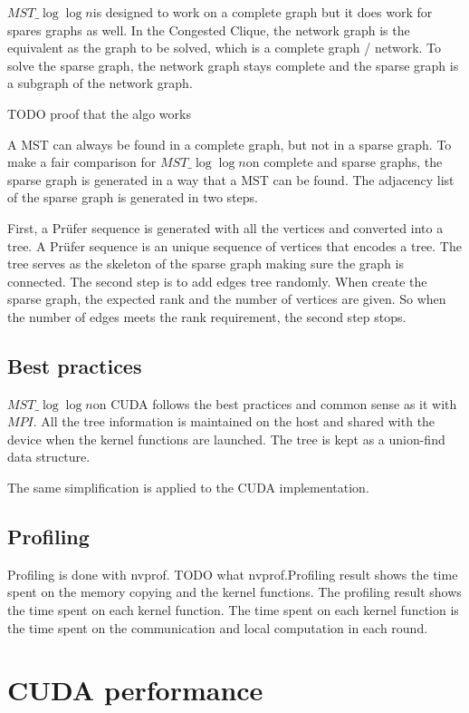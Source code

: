 \documentclass[english, 12pt, a4paper, elec, utf8, a-2b, online]{aaltothesis}
\newcommand{\mstalgo}{$MST\_\log\log{n}$}
\begin{document}
\mstalgo is designed to work on a complete graph but it does work for spares graphs as well. In the Congested Clique, the network graph is the equivalent as the graph to be solved, which is a complete graph / network. To solve the sparse graph, the network graph stays complete and the sparse graph is a subgraph of the network graph. 

TODO proof that the algo works

A MST can always be found in a complete graph, but not in a sparse graph. To make a fair comparison for \mstalgo on complete and sparse graphs, the sparse graph is generated in a way that a MST can be found. The adjacency list of the sparse graph is generated in two steps.

First, a Prüfer sequence is generated with all the vertices and converted into a tree. A Prüfer sequence is an unique sequence of vertices that encodes a tree. The tree serves as the skeleton of the sparse graph making sure the graph is connected. The second step is to add edges tree randomly. When create the sparse graph, the expected rank and the number of vertices are given. So when the number of edges meets the rank requirement, the second step stops.

\subsection{Best practices}
\mstalgo on CUDA follows the best practices and common sense as it with $MPI$. All the tree information is maintained on the host and shared with the device when the kernel functions are launched. The tree is kept as a union-find data structure. 

The same simplification is applied to the CUDA implementation.

\subsection{Profiling}
Profiling is done with nvprof. TODO what nvprof.Profiling result shows the time spent on the memory copying and the kernel functions. The profiling result shows the time spent on each kernel function. The time spent on each kernel function is the time spent on the communication and local computation in each round.
\clearpage

\section{CUDA performance}
\end{document}
